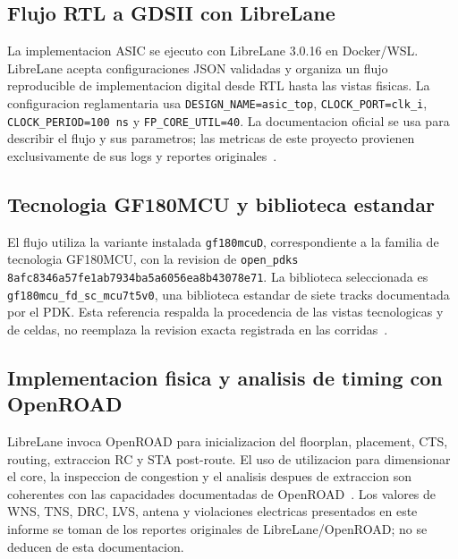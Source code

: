 % 
% 
%
% 

\subsection{Flujo RTL a GDSII con LibreLane}
La implementacion ASIC se ejecuto con LibreLane 3.0.16 en Docker/WSL. LibreLane
acepta configuraciones JSON validadas y organiza un flujo reproducible de
implementacion digital desde RTL hasta las vistas fisicas. La configuracion
reglamentaria usa \texttt{DESIGN\_NAME=asic\_top}, \texttt{CLOCK\_PORT=clk\_i},
\texttt{CLOCK\_PERIOD=100 ns} y \texttt{FP\_CORE\_UTIL=40}.
La documentacion oficial se usa para describir el flujo y sus parametros;
las metricas de este proyecto provienen exclusivamente de sus logs y reportes
originales~\cite{librelane_docs}.

\subsection{Tecnologia GF180MCU y biblioteca estandar}
El flujo utiliza la variante instalada \texttt{gf180mcuD}, correspondiente a
la familia de tecnologia GF180MCU, con la revision de \texttt{open\_pdks}
\texttt{8afc8346a57fe1ab7934ba5a6056ea8b43078e71}. La biblioteca seleccionada
es \texttt{gf180mcu\_fd\_sc\_mcu7t5v0}, una biblioteca estandar de siete
tracks documentada por el PDK. Esta referencia respalda la procedencia de las
vistas tecnologicas y de celdas, no reemplaza la revision exacta registrada en
las corridas~\cite{gf180mcu_pdk_docs}.

\subsection{Implementacion fisica y analisis de timing con OpenROAD}
LibreLane invoca OpenROAD para inicializacion del floorplan, placement, CTS,
routing, extraccion RC y STA post-route. El uso de utilizacion para dimensionar
el core, la inspeccion de congestion y el analisis despues de extraccion son
coherentes con las capacidades documentadas de OpenROAD~\cite{openroad_docs}.
Los valores de WNS, TNS, DRC, LVS, antena y violaciones electricas presentados
en este informe se toman de los reportes originales de LibreLane/OpenROAD; no
se deducen de esta documentacion.
